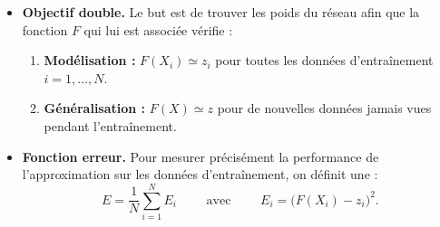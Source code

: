 \begin{itemize}
	\item \textbf{Objectif double.} Le but est de trouver les poids du réseau afin que la fonction $F$ qui lui est associée vérifie :
	\begin{enumerate}
		\item \textbf{Modélisation :} $F(X_i) \simeq z_i$ pour toutes les données d'entraînement $i=1,\ldots,N$.
		\item \textbf{Généralisation :} $F(X) \simeq z$ pour de nouvelles données jamais vues pendant l'entraînement.
	\end{enumerate}
	
	\item \textbf{Fonction erreur.} Pour mesurer précisément la performance de l'approximation sur les données d'entraînement, on définit une  :
	$$E = \frac{1}{N} \sum_{i=1}^N E_i \qquad \text{ avec } \qquad E_i = \big( F(X_i) - z_i \big)^2.$$
\end{itemize}


